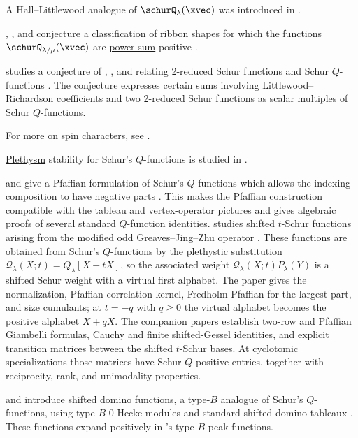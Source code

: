 A Hall--Littlewood analogue of $\schurQ_\lambda(\xvec)$ was introduced in
\cite{TudoseZabrocki2003}.

, , and  conjecture a
classification of ribbon shapes for which the functions
$\schurQ_{\lambda/\mu}(\xvec)$ are \hyperref[powerSum]{power-sum} positive
\cite{ChoHuhNam2020}.

 studies a conjecture of
, , and
 relating 2-reduced Schur functions and
Schur $Q$-functions \cite{Nishiyama2022x}.  The conjecture expresses certain
sums involving Littlewood--Richardson coefficients and two 2-reduced Schur
functions as scalar multiples of Schur $Q$-functions.

For more on spin characters, see \cite{MatsumotoSniady2020}.

\hyperref[plethysm]{Plethysm} stability for Schur's $Q$-functions is studied
in \cite{GrafJing2024x}.

 and  give a Pfaffian formulation of
Schur's $Q$-functions which allows the indexing composition to have negative
parts \cite{GrafJing2025}.  This makes the Pfaffian construction compatible
with the tableau and vertex-operator pictures and gives algebraic proofs of
several standard $Q$-function identities.
 studies shifted $t$-Schur functions arising from the
modified odd Greaves--Jing--Zhu operator
\cite{Lee2026x,Lee2026xModifiedOperator,Lee2026xTransitionMatrices}.  These functions
are obtained from Schur's $Q$-functions by the plethystic substitution
$\mathcal{Q}_\lambda(X;t)=Q_\lambda[X-tX]$, so the associated weight
$\mathcal{Q}_\lambda(X;t)P_\lambda(Y)$ is a shifted Schur weight with a
virtual first alphabet.  The paper gives the normalization, Pfaffian
correlation kernel, Fredholm Pfaffian for the largest part, and size
cumulants; at $t=-q$ with $q\geq 0$ the virtual alphabet becomes the positive
alphabet $X+qX$.
The companion papers establish two-row and Pfaffian Giambelli formulas,
Cauchy and finite shifted-Gessel identities, and explicit transition matrices
between the shifted $t$-Schur bases.  At cyclotomic specializations those
matrices have Schur-$Q$-positive entries, together with reciprocity, rank, and
unimodality properties.

 and  introduce shifted domino
functions, a type-$B$ analogue of Schur's $Q$-functions, using type-$B$
$0$-Hecke modules and standard shifted domino tableaux
\cite{DefantSearles2024x}.  These functions expand positively in
's type-$B$ peak functions.



